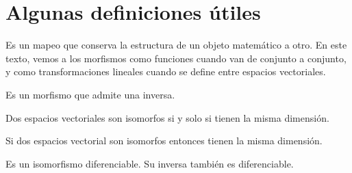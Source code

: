 \chapter{Algunas definiciones \'utiles}

\begin{definition}[Morfismo]
    \label{def:morphism}
    Es un mapeo que conserva la estructura de un objeto matem\'atico a otro. En este texto, vemos a los
    morfismos como funciones cuando van de conjunto a conjunto, y como transformaciones lineales cuando
    se define entre espacios vectoriales.
\end{definition}

\begin{definition}[Isomorfismo]
    \label{def:isomorphism}
    Es un morfismo que admite una inversa.
\end{definition}

\begin{theorem}
    Dos espacios vectoriales son isomorfos si y solo si tienen la misma dimensi\'on.
\end{theorem}

\begin{lemma}
    \label{lem:vector-space-dimension}
    Si dos espacios vectorial son isomorfos entonces tienen la misma dimensi\'on.
\end{lemma}

\begin{definition}[Difeomorfismo]
    \label{def:diffeomorphism}
    Es un isomorfismo diferenciable. Su inversa tambi\'en es diferenciable.
\end{definition}


